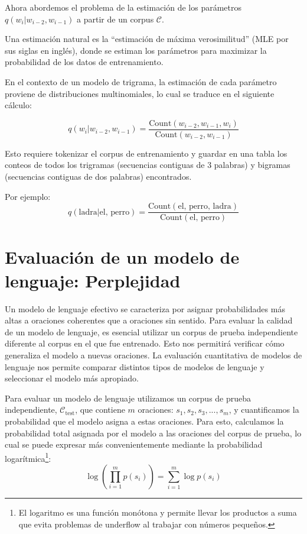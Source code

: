Ahora abordemos el problema de la estimación de los parámetros $q(w_i | w_{i-2}, w_{i-1})$ a partir de un corpus $\mathcal{C}$.

Una estimación natural es la ``estimación de máxima verosimilitud'' (MLE por sus siglas en inglés), donde se estiman los parámetros para maximizar la probabilidad de los datos de entrenamiento.

En el contexto de un modelo de trigrama, la estimación de cada parámetro proviene de distribuciones multinomiales, lo cual se traduce en el siguiente cálculo:

\[
q(w_i | w_{i-2}, w_{i-1}) = \frac{{\text{Count}(w_{i-2}, w_{i-1}, w_i)}}{{\text{Count}(w_{i-2}, w_{i-1})}}
\]

Esto requiere tokenizar el corpus de entrenamiento y guardar en una tabla los conteos de todos los trigramas (secuencias contiguas de 3 palabras) y bigramas (secuencias contiguas de dos palabras) encontrados.

\begin{example}
Por ejemplo:
\[
q(\text{ladra} | \text{el, perro}) = \frac{{\text{Count}(\text{el, perro, ladra})}}{{\text{Count}(\text{el, perro})}}
\] 
\end{example}




\section{Evaluación de un modelo de lenguaje: Perplejidad}

Un modelo de lenguaje efectivo se caracteriza por asignar probabilidades más altas a oraciones coherentes que a oraciones sin sentido. Para evaluar la calidad de un modelo de lenguaje, es esencial utilizar un corpus de prueba independiente diferente al corpus en el que fue entrenado. Esto nos permitirá verificar cómo generaliza el modelo a nuevas oraciones.  La evaluación cuantitativa de modelos de lenguaje nos permite comparar distintos tipos de modelos de lenguaje y seleccionar el modelo más apropiado.

Para evaluar un modelo de lenguaje utilizamos un corpus de prueba independiente, $\mathcal{C}_{\text{test}}$, que contiene $m$ oraciones: $s_1, s_2, s_3, ..., s_m$, y cuantificamos la probabilidad que el modelo asigna a estas oraciones. Para esto, calculamos la probabilidad total asignada por el modelo a las oraciones del corpus de prueba, lo cual se puede expresar más convenientemente mediante la probabilidad logarítmica\footnote{El logaritmo es una función monótona y permite llevar los productos a suma que evita problemas de underflow al trabajar con números pequeños.}:
\[
\log \left( \prod_{i=1}^{m} p(s_i) \right) = \sum_{i=1}^{m} \log p(s_i)
\]

